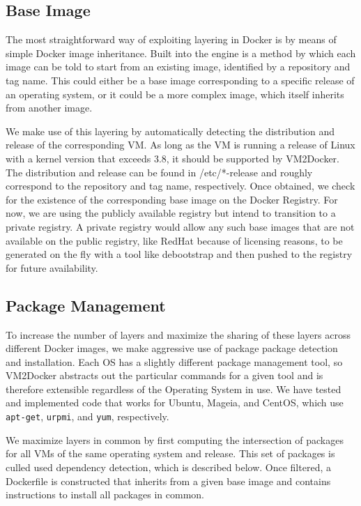 \subsection{Base Image}
\label{sec:osdetection}
The most straightforward way of exploiting layering in Docker is by means of simple Docker image inheritance. Built into the engine is a method by which each image can be told to start from an existing image, identified by a repository and tag name. This could either be a base image corresponding to a specific release of an operating system, or it could be a more complex image, which itself inherits from another image.

We make use of this layering by automatically detecting the distribution and release of the corresponding VM. As long as the VM is running a release of Linux with a kernel version that exceeds 3.8, it should be supported by VM2Docker. The distribution and release can be found in /etc/*-release and roughly correspond to the repository and tag name, respectively. Once obtained, we check for the existence of the corresponding base image on the Docker Registry. For now, we are using the publicly available registry but intend to transition to a private registry. A private registry would allow any such base images that are not available on the public registry, like RedHat because of licensing reasons, to be generated on the fly with a tool like debootstrap \cite{debootstrap} and then pushed to the registry for future availability.

\subsection{Package Management}
\label{sec:packagemanagement}

To increase the number of layers and maximize the sharing of these layers across different Docker images, we make aggressive use of package package detection and installation. Each OS has a slightly different package management tool, so VM2Docker abstracts out the particular commands for a given tool and is therefore extensible regardless of the Operating System in use. We have tested and implemented code that works for Ubuntu, Mageia, and CentOS, which use \texttt{apt-get}, \texttt{urpmi}, and \texttt{yum}, respectively.

We maximize layers in common by first computing the intersection of packages for all VMs of the same operating system and release. This set of packages is culled used dependency detection, which is described below. Once filtered, a Dockerfile is constructed that inherits from a given base image and contains instructions to install all packages in common.

